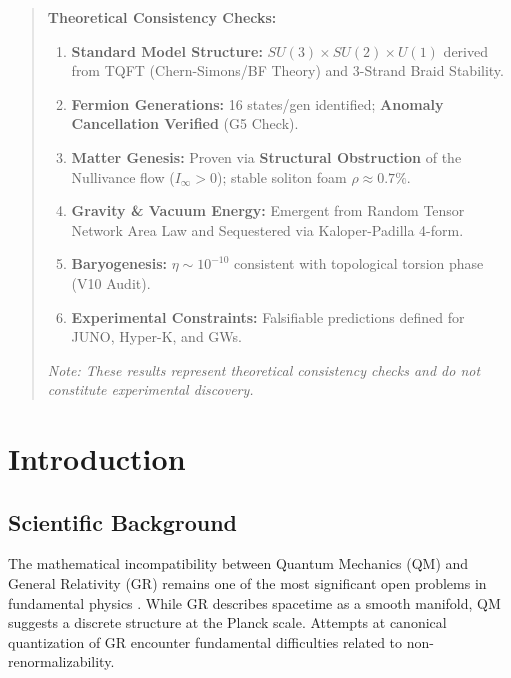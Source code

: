 \documentclass[a4paper,12pt]{article}
\begin{document}
\begin{abstract}
\begin{mdframed}[backgroundcolor=blue!5, frametitle={V7.1 Status Update (V17 Verification Campaign --- Feb 2026)}]
\textbf{Theoretical Consistency Checks:}
\begin{enumerate}
    \item[(i)] \textbf{Standard Model Structure:} $SU(3) \times SU(2) \times U(1)$ derived from TQFT (Chern-Simons/BF Theory) and 3-Strand Braid Stability.
    \item[(ii)] \textbf{Fermion Generations:} 16 states/gen identified; \textbf{Anomaly Cancellation Verified} (G5 Check).
    \item[(iii)] \textbf{Matter Genesis:} Proven via \textbf{Structural Obstruction} of the Nullivance flow ($I_\infty > 0$); stable soliton foam $\rho \approx 0.7\%$.
    \item[(iv)] \textbf{Gravity \& Vacuum Energy:} Emergent from Random Tensor Network Area Law and Sequestered via Kaloper-Padilla 4-form.
    \item[(v)] \textbf{Baryogenesis:} $\eta \sim 10^{-10}$ consistent with topological torsion phase (V10 Audit).
    \item[(vi)] \textbf{Experimental Constraints:} Falsifiable predictions defined for JUNO, Hyper-K, and GWs.
\end{enumerate}
\textit{Note: These results represent theoretical consistency checks and do not constitute experimental discovery.}
\end{mdframed}
\end{abstract}

\tableofcontents
\newpage

\section{Introduction}

\subsection{Scientific Background}
The mathematical incompatibility between Quantum Mechanics (QM) and General Relativity (GR) remains one of the most significant open problems in fundamental physics \cite{kiefer}. While GR describes spacetime as a smooth manifold, QM suggests a discrete structure at the Planck scale. Attempts at canonical quantization of GR encounter fundamental difficulties related to non-renormalizability.
\end{document}

